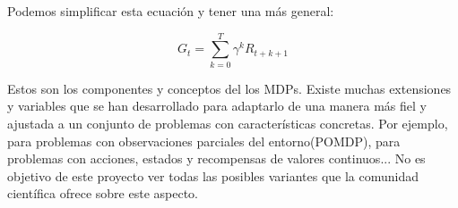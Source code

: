 \documentclass[11pt,fleqn]{book} %
\begin{document}
Podemos simplificar esta ecuación y tener una más general:

\begin{equation*}
G_t=\sum^T_{k=0}\gamma^kR_{t+k+1}
\end{equation*}

Estos son los componentes y conceptos del los MDPs. Existe muchas extensiones y variables que se han desarrollado para adaptarlo de una manera más fiel y ajustada a un conjunto de problemas con características concretas. Por ejemplo, para problemas con observaciones parciales del entorno(POMDP), para problemas con acciones, estados y recompensas de valores continuos... No es objetivo de este proyecto ver todas las posibles variantes que la comunidad científica ofrece sobre este aspecto.

%
%
%
\end{document}
